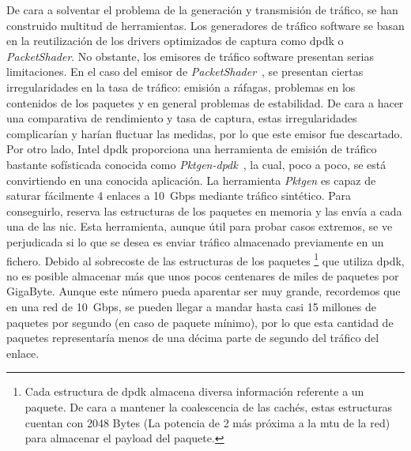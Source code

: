 De cara a solventar el problema de la generación y transmisión de tráfico, se han construido multitud de herramientas. Los generadores de tráfico software se basan en la reutilización de los drivers optimizados de captura como \gls{dpdk} o \textit{PacketShader}. No obstante, los emisores de tráfico software presentan serias limitaciones.
%
En el caso del emisor de \textit{PacketShader}~\cite{dpdk:packetshader}, se presentan ciertas irregularidades en la tasa de tráfico: emisión a ráfagas, problemas en los contenidos de los paquetes y en general problemas de estabilidad. De cara a hacer una comparativa de rendimiento y tasa de captura, estas irregularidades complicarían y harían fluctuar las medidas, por lo que este emisor fue descartado.
%
Por otro lado, Intel \gls{dpdk} proporciona una herramienta de emisión de tráfico bastante sofísticada conocida como \textit{Pktgen-\gls{dpdk}}~\cite{bib:dpdkpktgen}, la cual, poco a poco, se está convirtiendo en una conocida aplicación. 
La herramienta \textit{Pktgen} es capaz de saturar fácilmente 4 enlaces a 10~Gbps mediante tráfico sintético. Para conseguirlo, reserva las estructuras de los paquetes en memoria y las envía a cada una de las \gls{nic}. Esta herramienta, aunque útil para probar casos extremos, se ve perjudicada si lo que se desea es enviar tráfico almacenado previamente en un fichero. Debido al sobrecoste de las estructuras de los paquetes%
\footnote{Cada estructura de \gls{dpdk} almacena diversa información referente a un paquete. De cara a mantener la coalescencia de las cachés, estas estructuras cuentan con 2048 Bytes (La potencia de 2 más próxima a la \gls{mtu} de la red) para almacenar el payload del paquete.}%
 que utiliza \gls{dpdk}, no es posible almacenar más que unos pocos centenares de miles de paquetes por GigaByte. Aunque este número pueda aparentar ser muy grande, recordemos que en una red de 10~Gbps, se pueden llegar a mandar hasta casi 15 millones de paquetes por segundo (en caso de paquete mínimo), por lo que esta cantidad de paquetes representaría menos de una décima parte de segundo del tráfico del enlace.
 
